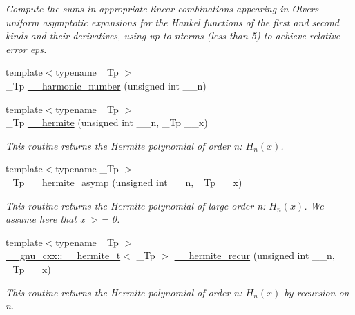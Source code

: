 \begin{DoxyCompactItemize}
\begin{DoxyCompactList}\small\item\em Compute the sums in appropriate linear combinations appearing in Olver\textquotesingle{}s uniform asymptotic expansions for the Hankel functions of the first and second kinds and their derivatives, using up to nterms (less than 5) to achieve relative error {\ttfamily eps}. \end{DoxyCompactList}\item 
{\footnotesize template$<$typename \+\_\+\+Tp $>$ }\\\+\_\+\+Tp \hyperlink{namespacestd_1_1____detail_aeab2857a72e09b180a765bf435f72c2e}{\+\_\+\+\_\+harmonic\+\_\+number} (unsigned int \+\_\+\+\_\+n)
\item 
{\footnotesize template$<$typename \+\_\+\+Tp $>$ }\\\+\_\+\+Tp \hyperlink{namespacestd_1_1____detail_aeb57881dd224320629e184c9118c910b}{\+\_\+\+\_\+hermite} (unsigned int \+\_\+\+\_\+n, \+\_\+\+Tp \+\_\+\+\_\+x)
\begin{DoxyCompactList}\small\item\em This routine returns the Hermite polynomial of order n\+: $ H_n(x) $. \end{DoxyCompactList}\item 
{\footnotesize template$<$typename \+\_\+\+Tp $>$ }\\\+\_\+\+Tp \hyperlink{namespacestd_1_1____detail_ae44761bc16e62979edeccf4535ec553a}{\+\_\+\+\_\+hermite\+\_\+asymp} (unsigned int \+\_\+\+\_\+n, \+\_\+\+Tp \+\_\+\+\_\+x)
\begin{DoxyCompactList}\small\item\em This routine returns the Hermite polynomial of large order n\+: $ H_n(x) $. We assume here that x $>$= 0. \end{DoxyCompactList}\item 
{\footnotesize template$<$typename \+\_\+\+Tp $>$ }\\\hyperlink{struct____gnu__cxx_1_1____hermite__t}{\+\_\+\+\_\+gnu\+\_\+cxx\+::\+\_\+\+\_\+hermite\+\_\+t}$<$ \+\_\+\+Tp $>$ \hyperlink{namespacestd_1_1____detail_addad9d3f5ca8a7ddae63c9e7c5374e70}{\+\_\+\+\_\+hermite\+\_\+recur} (unsigned int \+\_\+\+\_\+n, \+\_\+\+Tp \+\_\+\+\_\+x)
\begin{DoxyCompactList}\small\item\em This routine returns the Hermite polynomial of order n\+: $ H_n(x) $ by recursion on n. \end{DoxyCompactList}\item 

\end{DoxyCompactItemize}
